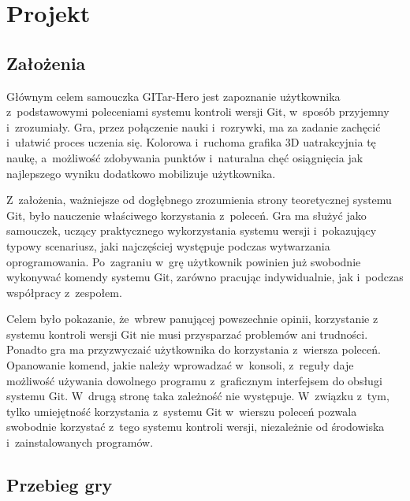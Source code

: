 \documentclass[12pt,a4paper,polish,thesis]{dcsbook}
\begin{document}
{	\chapter{Projekt} \label{Projekt}

	\section{Założenia}
		
	Głównym celem samouczka GITar-Hero jest zapoznanie użytkownika z~podstawowymi poleceniami systemu kontroli wersji Git, w~sposób przyjemny i~zrozumiały. Gra, przez połączenie nauki i~rozrywki, ma za zadanie zachęcić i~ułatwić proces uczenia się. Kolorowa i~ruchoma grafika 3D uatrakcyjnia tę naukę, a~możliwość zdobywania punktów i~naturalna chęć osiągnięcia jak najlepszego wyniku dodatkowo mobilizuje użytkownika.

	Z~założenia, ważniejsze od dogłębnego zrozumienia strony teoretycznej systemu Git, było nauczenie właściwego korzystania z~poleceń. Gra ma służyć jako samouczek, uczący praktycznego wykorzystania systemu wersji i~pokazujący typowy scenariusz, jaki najczęściej występuje podczas wytwarzania oprogramowania. Po~zagraniu w~grę użytkownik powinien już swobodnie wykonywać komendy systemu Git, zarówno pracując indywidualnie, jak i~podczas współpracy z~zespołem. 
	
	Celem było pokazanie, że~wbrew panującej powszechnie opinii, korzystanie z systemu kontroli wersji Git nie musi przysparzać problemów ani trudności. Ponadto gra ma przyzwyczaić użytkownika do korzystania z~wiersza poleceń. Opanowanie komend, jakie należy wprowadzać w~konsoli, z~reguły daje możliwość używania dowolnego programu z~graficznym interfejsem do obsługi systemu Git. W~drugą stronę taka zależność nie występuje. W~związku z~tym, tylko umiejętność korzystania z~systemu Git w~wierszu poleceń pozwala swobodnie korzystać z~tego systemu kontroli wersji, niezależnie od środowiska i~zainstalowanych programów.
	 
	\section{Przebieg gry}
	
}
\end{document}

